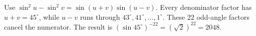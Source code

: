 Use $\sin^2u-\sin^2v=\sin(u+v)\sin(u-v)$. Every denominator factor has $u+v=45^\circ$, while $u-v$ runs through $43^\circ,41^\circ,\ldots,1^\circ$. These $22$ odd-angle factors cancel the numerator. The result is $(\sin45^\circ)^{-22}=(\sqrt2)^{22}=\boxed{2048}$.

